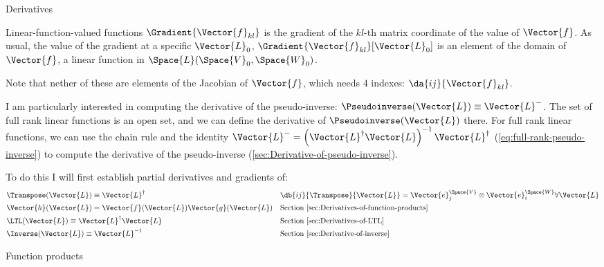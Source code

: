\begin{plSection}{Derivatives}
\begin{plSection}{Linear-function-valued functions}
$\Gradient{\Vector{f}_{kl}}$ is the gradient of the $kl$-th matrix coordinate of the value of $\Vector{f}$.
As usual, the value of the gradient at a specific $\Vector{L}_0$,
$\Gradient{\Vector{f}_{kl}}[\Vector{L}_0]$ 
is an element of the domain of $\Vector{f}$,
a linear function in $\Space{L}(\Space{V}_0,\Space{W}_0)$.

Note that nether of these are elements of the Jacobian of $\Vector{f}$,
which needs 4 indexes: $\da{ij}{\Vector{f}_{kl}}$.

I am particularly interested in computing the derivative of the
pseudo-inverse: $\Pseudoinverse(\Vector{L}) \equiv \Vector{L}^{-}$.
The set of full rank linear functions is an open set,
and we can define the derivative of $\Pseudoinverse(\Vector{L})$ there.
For full rank linear functions,
we can use the chain rule and the identity
$\Vector{L}^{-} = \left( \Vector{L}^{\dagger} \Vector{L} \right)^{-1} \Vector{L}^{\dagger}$
(\cref{eq:full-rank-pseudo-inverse})
to compute the derivative of the pseudo-inverse
(\cref{sec:Derivative-of-pseudo-inverse}).

To do this I will first establish partial derivatives and gradients of:
\begin{equation}
\begin{aligned}
\label{eq:transpose-derivative}
&\Transpose(\Vector{L}) \equiv \Vector{L}^{\dagger}
&&\db{ij}{\Transpose}{\Vector{L}} =  \Vector{e}_j^{\Space{V}} \otimes \Vector{e}_i^{\Space{W}}
\forall \Vector{L}
\\
&\Vector{h}( \Vector{L} ) = \Vector{f} ( \Vector{L} ) \Vector{g} ( \Vector{L} )
&&\text{Section~\ref{sec:Derivatives-of-function-products} }
\\
&\LTL(\Vector{L}) \equiv \Vector{L}^{\dagger} \Vector{L}
&&\text{Section~\ref{sec:Derivatives-of-LTL} }
\\
&\Inverse(\Vector{L}) \equiv \Vector{L}^{-1}
&&\text{Section~\ref{sec:Derivative-of-inverse} }
\end{aligned}
\end{equation}

\begin{plSection}{Function products}
\label{sec:Derivatives-of-function-products}


\end{plSection}
\end{plSection}
\end{plSection}
